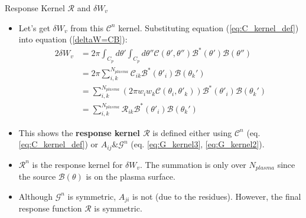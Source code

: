 \documentclass[8pt]{beamer}
\begin{document}
\begin{frame}{\color{white} Response Kernel $\mathcal{R}$ and $\delta W_v$}
\begin{itemize}
    \item Let's get $\delta W_v$ from this $\mathcal{C}^n$ kernel. Substituting equation (\ref{eq:C_kernel_def}) into equation (\ref{deltaW=CB}):
    \begin{align}
         2\delta W_v &= 2\pi \int_{C_p} d\theta' \int_{C_p} d\theta'' \mathcal{C}(\theta',\theta'') \mathcal{B}^*(\theta') \mathcal{B}(\theta'') \\
         &= 2\pi \sum_{i,k}^{N_{plasma}} \mathcal{C}_{ik} \mathcal{B^*}(\theta'_i) \mathcal{B}(\theta_k') \\
         &= \sum_{i,k}^{N_{plasma}} (2 \pi w_i w_k \mathcal{C}(\theta_i,\theta'_k)) \mathcal{B^*}(\theta'_i) \mathcal{B}(\theta_k') \label{eq:G_kernel3}\\
         &= \sum_{i,k}^{N_{plasma}} \mathcal{R}_{ik} \mathcal{B^*}(\theta'_i) \mathcal{B}(\theta_k') \label{eq:G_kernel2}
    \end{align}
    \item This shows the \textbf{response kernel $\mathcal{R}$} is defined either using $\mathcal{C}^n$ (eq. \ref{eq:C_kernel_def}) or $A_{ij} \& \mathcal{G}^n$ (eq. \ref{eq:G_kernel3}, \ref{eq:G_kernel2}).
    \item $\mathcal{R}^n$ is the response kernel for $\delta W_v$. The summation is only over $N_{plasma}$ since the source $\mathcal{B}(\theta)$ is on the plasma surface.
    \item Although $\mathcal{G}^n$ is symmetric, $A_{ji}$ is not (due to the residues). However, the final response function $\mathcal{R}$ is symmetric.
\end{itemize}
\end{frame}
\end{document}
